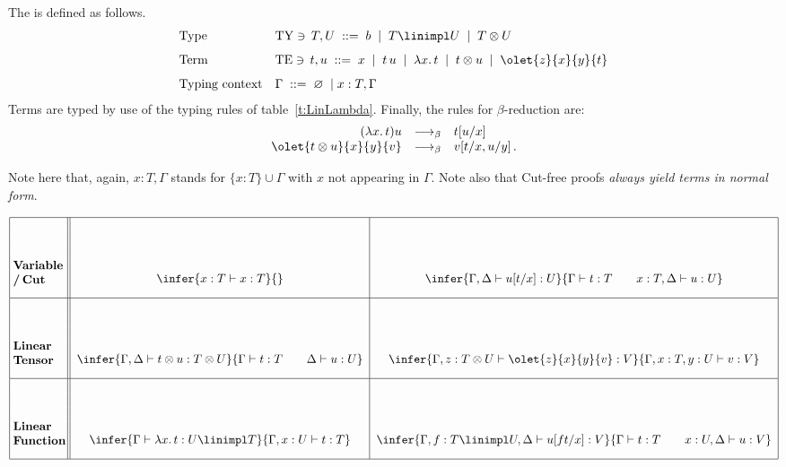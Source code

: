 \documentclass[12pt]{article}
\begin{document}
\begin{mydefinition}
The  is defined as follows.
\begin{align*}
&\text{Type} && \mathrm{TY}\ni\, T,U \; ::= \; b \; \mid \; T \linimpl U \; \mid \; T \otimes U
\\[1.5mm]
&\text{Term} && \mathrm{TE}\ni\,t,u\; ::= \; x \; \mid \; {t\,u} \;\mid\; {\lambda x.\, t} \;\mid\; t\otimes u \;\mid\; \olet{z}{x}{y}{t} \\[1.5mm]
&\text{Typing context} && \Gamma \;::=\; \varnothing\; \mid x : T,\Gamma
\end{align*}
Terms are typed by use of the typing rules of table~\ref{t:LinLambda}. Finally,
the rules for $\beta$-reduction are:
\[ \begin{array}{rcl}
(\lambda x. \, t)u & \longrightarrow_\beta & t[u/x] \\
\olet{t \otimes u}{x}{y}{v} & \longrightarrow_\beta & v[t/x,u/y]\,.
\end{array} \]
\deq[-1]
\end{mydefinition}
%
Note here that, again,  $x : T,\Gamma$ stands for $\{x:T\}\cup\Gamma$ with $x$ not appearing in $\Gamma$. Note also that Cut-free proofs \emph{always yield terms in normal form}.
\begin{center}
\renewcommand{\arraystretch}{.3}
{$\begin{array}{|@{\;}l@{\;}||@{\;\;}c@{\;\;}|@{\;\;}c@{\;\;}|} \hline&&\\&&\\&&\\
\parbox{15mm}{\bfseries Variable\\/\,Cut\\} & \infer{x:T \vdash  x:T}{} & \infer{\Gamma,\Delta\vdash u[t/x] : U}{\Gamma \vdash t : T  \qquad x : T, \Delta  \vdash u : U}
\\\hline&&\\&&\\&&\\
\parbox{15mm}{\bfseries Linear\\ Tensor\\} &\infer{\Gamma,\Delta\vdash t\otimes u:T\otimes U}{\Gamma\vdash t:T\qquad\Delta\vdash u:U} &%
\infer{\Gamma,z:T\otimes U\vdash\olet{z}{x}{y}{v}:V}{\Gamma,x:T,y:U\vdash v:V}
\\\hline&&\\&&\\&&\\
\parbox{15mm}{\bfseries Linear\\ Function\\} &\infer{\Gamma\vdash\lambda x.\,t:U\linimpl T}{\Gamma,x:U\vdash t:T} &%
\infer{\Gamma,f:T\linimpl U,\Delta\vdash u[ft/x]:V}{\Gamma\vdash t:T\qquad x:U,\Delta\vdash u:V}
\\\hline
\end{array}$}\label{t:LinLambda}
\end{center}
\end{document}
